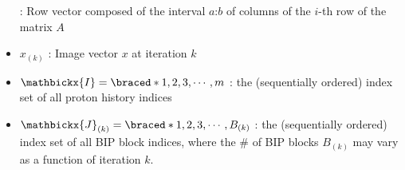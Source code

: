 \begin{tcbenvironment}
\begin{tcbparbox}
\begin{itemize}
            : Row vector composed of the interval $a\texttt{:}b$ of columns of the $i$-th row of the matrix $A$
        \item $x_{(k)}$ : Image vector $x$ at iteration $k$
        \item $\mathbickx{I}%
            =\braced*{1, 2, 3, \cdots, m}$ %
             : the (sequentially ordered) index set of all proton history indices
        \item $\mathbickx{J}_{(k)}%
            =\braced*{1, 2, 3, \cdots, B_{(k)}}$ %
             : the (sequentially ordered) index set of all BIP block indices, where the \# of BIP blocks $B_{(k)}$ may vary as a function of iteration $k$.

\end{itemize}
\end{tcbparbox}
\end{tcbenvironment}
